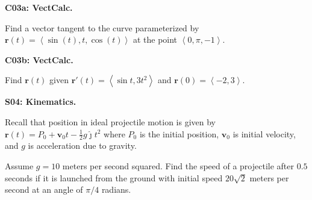 \documentclass[12pt]{article}
\newcommand{\vect}{\mathbf}
\newcommand{\<}{\left\langle}
\renewcommand{\>}{\right\rangle}
\newcommand{\vecj}{\hat{\jmath}}
\newcommand{\exerciseHeader}[4]{


  \vspace{0.5em}
  \textbf{#2}
  \vspace{0.5em}

}
\begin{document}
\begin{multicols}{2}
%



%
\exerciseHeader{2017 June 12}{C03a: VectCalc.}{
Compute and apply vector function limits, derivatives, and integrals.
}{2/4}

Find a vector tangent to the curve parameterized by
\(\vect r(t)=\<\sin(t),t,\cos(t)\>\) at the point \(\<0,\pi,-1\>\).

%

\exerciseHeader{2017 June 14}{C03b: VectCalc.}{
Compute and apply vector function limits, derivatives, and integrals.
}{4/4}

Find \(\vect r(t)\) given \(\vect r'(t)=\<\sin t,3t^2\>\) and
\(\vect r(0)=\<-2,3\>\).

\columnbreak

\exerciseHeader{2017 June 13}{S04: Kinematics.}{
Compute and apply position, velocity, and acceleration vector functions.
}{1/3}

Recall that position in ideal projectile motion is given by
\(\vect r(t) = P_0+\vect{v}_0 t-\frac{1}{2}g\vecj t^2\) where
\(P_0\) is the initial position, \(\vect{v}_0\) is initial velocity,
and \(g\) is acceleration due to gravity.

Assume \(g=10\) meters per second squared.
Find the speed of a projectile after \(0.5\) seconds if it is launched
from the ground
with initial speed \(20\sqrt{2}\)
meters per second at an angle of \(\pi/4\) radians.

%


\end{multicols}
\end{document}
